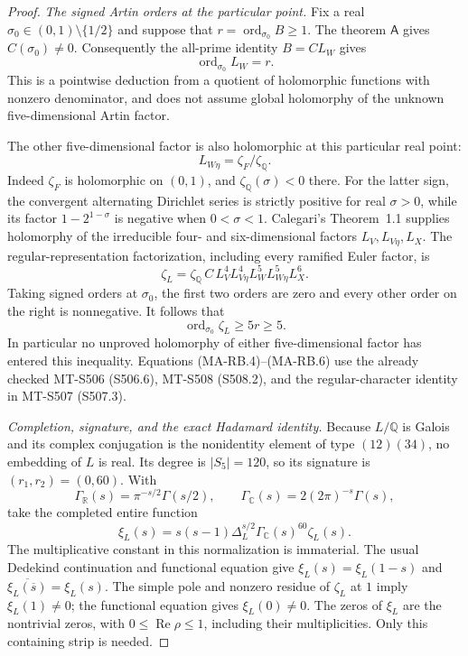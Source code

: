 \begin{proof}
\emph{The signed Artin orders at the particular point.}
Fix a real $\sigma_0\in(0,1)\setminus\{1/2\}$ and suppose that
$r=\operatorname{ord}_{\sigma_0}B\ge1$.
The theorem $\mathsf A$ gives $C(\sigma_0)\ne0$.
Consequently the all-prime identity $B=C L_W$ gives
\[
                 \operatorname{ord}_{\sigma_0}L_W=r.
 \tag{MA-RB.4}
\]
This is a pointwise deduction from a quotient of holomorphic
functions with nonzero denominator, and does not assume global
holomorphy of the unknown five-dimensional Artin factor.

The other five-dimensional factor is also holomorphic at this
particular real point:
\[
                   L_{W\eta}=\zeta_F/\zeta_{\mathbb Q}.
 \tag{MA-RB.5}
\]
Indeed $\zeta_F$ is holomorphic on $(0,1)$, and
$\zeta_{\mathbb Q}(\sigma)<0$ there.  For the latter sign, the
convergent alternating Dirichlet series is strictly positive
for real $\sigma>0$, while its factor
$1-2^{1-\sigma}$ is negative when $0<\sigma<1$.
Calegari's Theorem~1.1 supplies holomorphy of the irreducible
four- and six-dimensional factors $L_V,L_{V\eta},L_X$.
The regular-representation factorization, including every
ramified Euler factor, is
\[
 \zeta_L
   =\zeta_{\mathbb Q}\,C\,
       L_V^4L_{V\eta}^4L_W^5L_{W\eta}^5L_X^6.
 \tag{MA-RB.6}
\]
Taking signed orders at $\sigma_0$, the first two orders are
zero and every other order on the right is nonnegative.
It follows that
\[
                 \operatorname{ord}_{\sigma_0}\zeta_L
                         \ge5r\ge5.
 \tag{MA-RB.7}
\]
In particular no unproved holomorphy of either
five-dimensional factor has entered this inequality.
Equations (MA-RB.4)--(MA-RB.6) use the already checked
MT-S506 (S506.6), MT-S508 (S508.2), and the regular-character
identity in MT-S507 (S507.3).

\emph{Completion, signature, and the exact Hadamard identity.}
Because $L/\mathbb Q$ is Galois and its complex conjugation is the
nonidentity element of type $(12)(34)$, no embedding of $L$ is
real.  Its degree is $|S_5|=120$, so its signature is
$(r_1,r_2)=(0,60)$.  With
\[
 \Gamma_{\mathbb R}(s)=\pi^{-s/2}\Gamma(s/2),
 \qquad
 \Gamma_{\mathbb C}(s)=2(2\pi)^{-s}\Gamma(s),
\]
take the completed entire function
\[
 \xi_L(s)
   =s(s-1)\Delta_L^{s/2}\Gamma_{\mathbb C}(s)^{60}\zeta_L(s).
 \tag{MA-RB.8}
\]
The multiplicative constant in this normalization is immaterial.
The usual Dedekind continuation and functional equation give
$\xi_L(s)=\xi_L(1-s)$ and
$\overline{\xi_L(\overline s)}=\xi_L(s)$.
The simple pole and nonzero residue of $\zeta_L$ at $1$ imply
$\xi_L(1)\ne0$; the functional equation gives $\xi_L(0)\ne0$.
The zeros of $\xi_L$ are the nontrivial zeros, with
$0\le\operatorname{Re}\rho\le1$, including their multiplicities.
Only this containing strip is needed.


\end{proof}
